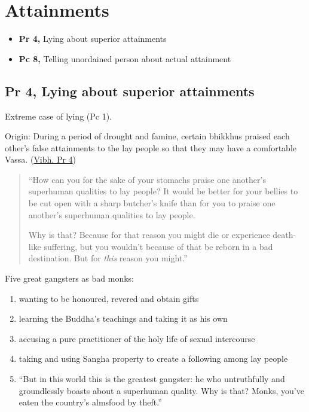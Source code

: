 \chapter{Attainments}

\begin{itemize}
\tightlist
\item
  \textbf{Pr 4,} Lying about superior attainments
\item
  \textbf{Pc 8,} Telling unordained person about actual attainment
\end{itemize}


\section{Pr 4, Lying about superior attainments}

Extreme case of lying (Pc 1).

Origin: During a period of drought and famine, certain bhikkhus praised
each other's false attainments to the lay people so that they may have a
comfortable Vassa.
(\href{https://suttacentral.net/pli-tv-bu-vb-pj4/en/brahmali}{Vibh. Pr
4})

\begin{quote}
``How can you for the sake of your stomachs praise one another's
superhuman qualities to lay people? It would be better for your bellies
to be cut open with a sharp butcher's knife than for you to praise one
another's superhuman qualities to lay people.

Why is that? Because for that reason you might die or experience
death-like suffering, but you wouldn't because of that be reborn in a
bad destination. But for \emph{this} reason you might.''
\end{quote}

\clearpage

Five great gangsters as bad monks:

\begin{enumerate}
\def\labelenumi{\arabic{enumi}.}
\tightlist
\item
  wanting to be honoured, revered and obtain gifts
\item
  learning the Buddha's teachings and taking it as his own
\item
  accusing a pure practitioner of the holy life of sexual intercourse
\item
  taking and using Sangha property to create a following among lay
  people
\item
  ``But in this world this is the greatest gangster: he who untruthfully
  and groundlessly boasts about a superhuman quality. Why is that?
  Monks, you've eaten the country's almsfood by theft.''
\end{enumerate}

